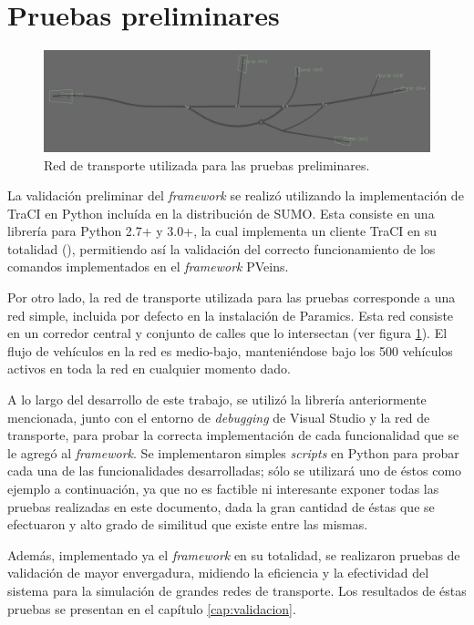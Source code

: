 \section{Pruebas preliminares}

\begin{figure}
    \centering
    \includegraphics[width=\linewidth]{figuras/network8.png}
    \caption{Red de transporte utilizada para las pruebas preliminares.}
    \label{fig:network8}
\end{figure}

La validación preliminar del \emph{framework} se realizó utilizando la implementación de TraCI en Python incluída en la distribución de SUMO. Esta consiste en una librería para Python 2.7+ y 3.0+, la cual implementa un cliente TraCI en su totalidad (\autocite{pytraci, pytracisrc}), permitiendo así la validación del correcto funcionamiento de los comandos implementados en el \emph{framework} PVeins.

Por otro lado, la red de transporte utilizada para las pruebas corresponde a una red simple, incluida por defecto en la instalación de Paramics. Esta red consiste en un corredor central y conjunto de calles que lo intersectan (ver figura \ref{fig:network8}). El flujo de vehículos en la red es medio-bajo, manteniéndose bajo los 500 vehículos activos en toda la red en cualquier momento dado.

A lo largo del desarrollo de este trabajo, se utilizó la librería anteriormente mencionada, junto con el entorno de \emph{debugging} de Visual Studio y la red de transporte, para probar la correcta implementación de cada funcionalidad que se le agregó al \emph{framework}. Se implementaron simples \emph{scripts} en Python para probar cada una de las funcionalidades desarrolladas; sólo se utilizará uno de éstos como ejemplo a continuación, ya que no es factible ni interesante exponer todas las pruebas realizadas en este documento, dada la gran cantidad de éstas que se efectuaron y alto grado de similitud que existe entre las mismas.

Además, implementado ya el \emph{framework} en su totalidad, se realizaron pruebas de validación de mayor envergadura, midiendo la eficiencia y la efectividad del sistema para la simulación de grandes redes de transporte. Los resultados de éstas pruebas se presentan en el capítulo \ref{cap:validacion}.

